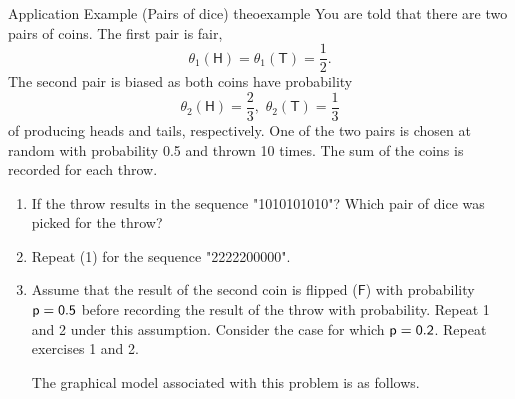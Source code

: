 \documentclass{tufte-handout}
\begin{document}
\begin{mybox}{Application Example (Pairs of dice) }{theoexample}
\small
You are told that there are two pairs of coins. The first pair is fair, $$\theta_1(\mathsf H)=\theta_1(\mathsf T)=\frac{1}{2}.$$ The second pair is biased as both coins have probability $$\theta_2(\mathsf H)=\frac{2}{3},\,\, \theta_2(\mathsf T)=\frac{1}{3}$$  of producing heads  and  tails, respectively. One of the two pairs is chosen at random with probability 0.5 and thrown 10 times. The sum of the coins is recorded for each throw.
 \begin{enumerate}
\item If the throw results in the sequence "1010101010"? Which pair of dice was picked for the throw?
\item Repeat (1) for the sequence "2222200000". 
\item Assume that the result of the second coin is flipped ($\mathsf F$) with probability $\sf p=0.5$ before recording the result of the throw with probability. Repeat  1 and 2 under this assumption. Consider the case for which  $\sf p = 0.2$. Repeat exercises 1 and 2.
\vspace{0.2cm}

\noindent The graphical model associated with this problem is as follows.


\end{enumerate}
\end{mybox}
\end{document}
